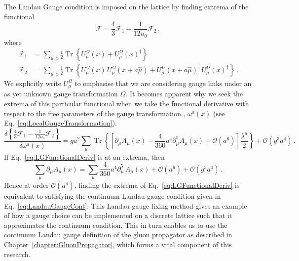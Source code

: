 The Landau Gauge condition is imposed on the lattice by finding extrema of the functional~\cite{Bonnet:1999mj}
%
\begin{equation}
\mathcal{F} =  \frac{4}{3}\mathcal{F}_1 - \frac{1}{12u_0}\mathcal{F}_2\, ,
\label{eq:LGFunctional}
\end{equation}
%
where
%
\begin{align*}
\mathcal{F}_1 &= \sum _ { \mu , x } \frac { 1 } { 2 } \operatorname { Tr } \left\{ U _ { \mu } ^ { \Omega } ( x ) + U _ { \mu } ^ { \Omega } ( x ) ^ { \dagger } \right\}\\
\mathcal{F}_2 &= \sum _ { \mu , x } \frac { 1 } { 2 } \operatorname { Tr } \left\{ U _ { \mu } ^ { \Omega } ( x ) \,U _ { \mu } ^ { \Omega } ( x + a\hat { \mu } ) + U _ { \mu } ^ { \Omega } ( x + a\hat { \mu } )^\dagger\, U _ { \mu } ^ { \Omega } ( x )^\dagger  \right\}\, .
\end{align*}
%
We explicitly write $U^\Omega_\mu$ to emphasise that we are considering gauge links under an as yet unknown gauge transformation $\Omega$. It becomes apparent why we seek the extrema of this particular functional when we take the functional derivative with respect to the free parameters of the gauge transformation , $\omega^a(x)$ (see Eq.~\ref{eq:LocalGaugeTransformation}).
%
\begin{equation}
\frac { \delta \left\{ \frac { 4 } { 3 } \mathcal { F } _ { 1 } - \frac { 1 } { 12 u _ { 0 } } \mathcal { F } _ { 2 } \right\} } { \delta \omega ^ { a } ( x ) } = g a ^ { 2 } \sum _ { \mu } \operatorname { Tr } \left\{ \left[ \partial _ { \mu } A _ { \mu } ( x ) - \frac { 4 } { 360 } a ^ { 4 } \partial _ { \mu } ^ { 5 } A _ { \mu } ( x ) + \mathcal { O } \left( a ^ { 6 } \right) \right] \frac{\lambda^a}{2} \right\} + \mathcal { O } \left( g ^ { 3 } a ^ { 4 } \right)\, .
\label{eq:LGFunctionalDeriv}
\end{equation}
%
If Eq.~\ref{eq:LGFunctionalDeriv} is at an extrema, then 
%
\begin{equation*}
\sum_\mu \partial_\mu A_\mu(x) = \sum_\mu \frac{4}{360}a^4 \partial_\mu^5\,A_\mu(x) + \mathcal{O}(a^6)+\mathcal{O}(g^3a^4)\, .
\end{equation*}
%
Hence at order $\mathcal{O}(a^4)$, finding the extrema of Eq.~\ref{eq:LGFunctionalDeriv} is equivalent to satisfying the continuum Landau gauge condition given in Eq.~\ref{eq:LandauGaugeCont}. This Landau gauge fixing method gives an example of how a gauge choice can be implemented on a discrete lattice such that it approximates the continuum condition. This in turn enables us to use the continuum Landau gauge definition of the gluon propagator as described in Chapter~\ref{chapter:GluonPropagator}, which forms a vital component of this research.


